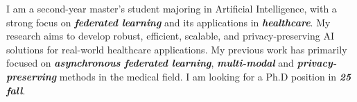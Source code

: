 

\begin{cvparagraph}


I am a second-year master's student majoring in Artificial Intelligence, 
with a strong focus on \textit{\textbf{federated learning}} and its applications in \textit{\textbf{healthcare}}. 
My research aims to develop robust, efficient, scalable, and privacy-preserving AI solutions for real-world healthcare applications. 
My previous work has primarily focused on \textit{\textbf{asynchronous federated learning}}, \textit{\textbf{multi-modal}} and \textit{\textbf{privacy-preserving}} methods in the medical field. 
I am looking for a Ph.D position in \textit{\textbf{25 fall}}.


\end{cvparagraph}
